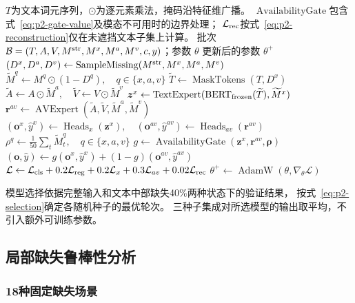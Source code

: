\documentclass[bwprint]{gmcmthesis}
\begin{document}
\begin{algorithm}[!htbp]
 \caption{观测掩码驱动的混合专家模型训练}
 \label{alg:p2-training}
 \begin{algorithmic}[1]
  \setlength{\itemsep}{4pt}
  \setlength{\parsep}{0pt}
  \AlgDescription $T$为文本词元序列，$\odot$为逐元素乘法，掩码沿特征维广播。
  $\operatorname{AvailabilityGate}$包含式~\eqref{eq:p2-gate-value}及模态不可用时的边界处理；
  $\mathcal L_{\rm rec}$按式~\eqref{eq:p2-reconstruction}仅在未遮挡文本子集上计算。
  \Require 批次 $\mathcal B=(T,A,V,M^{\rm str},M^x,M^a,M^v,c,y)$；参数 $\theta$
  \Ensure 更新后的参数 $\theta^{+}$
  \State $(D^x,D^a,D^v)\gets\operatorname{SampleMissing}(M^{\rm str},M^x,M^a,M^v)$
  \State $\widetilde M^q\gets M^q\odot(1-D^q),\quad q\in\{x,a,v\}$
  \State $\widetilde T\gets\operatorname{MaskTokens}(T,D^x)$
  \State $\widetilde A\gets A\odot\widetilde M^a,\quad\widetilde V\gets V\odot\widetilde M^v$
  \State $\boldsymbol z^x\gets\operatorname{TextExpert}(\operatorname{BERT}_{\rm frozen}(\widetilde T),\widetilde M^x)$
  \State $\boldsymbol r^{av}\gets\operatorname{AVExpert}(\widetilde A,\widetilde V,\widetilde M^a,\widetilde M^v)$
  \State $(\boldsymbol o^x,\hat y^x)\gets\operatorname{Heads}_x(\boldsymbol z^x),\quad
         (\boldsymbol o^{av},\hat y^{av})\gets\operatorname{Heads}_{av}(\boldsymbol r^{av})$
  \State $\rho^q\gets\frac{1}{50}\sum_t\widetilde M_t^q,\quad q\in\{x,a,v\}$
  \State $g\gets\operatorname{AvailabilityGate}(\boldsymbol z^x,\boldsymbol r^{av},\boldsymbol\rho)$
  \State $(\boldsymbol o,\hat y)\gets g(\boldsymbol o^x,\hat y^x)+(1-g)(\boldsymbol o^{av},\hat y^{av})$
  \State $\mathcal L\gets\mathcal L_{\rm cls}+0.2\mathcal L_{\rm reg}
         +0.2\mathcal L_x+0.3\mathcal L_{av}+0.02\mathcal L_{\rm rec}$
  \State $\theta^{+}\gets\operatorname{AdamW}(\theta,\nabla_\theta\mathcal L)$
 \end{algorithmic}
\end{algorithm}

模型选择依据完整输入和文本中部缺失40\%两种状态下的验证结果，
按式~\eqref{eq:p2-selection}确定各随机种子的最优轮次。
三种子集成对所选模型的输出取平均，不引入额外可训练参数。

\subsection{局部缺失鲁棒性分析}

\subsubsection{18种固定缺失场景}
\end{document}
